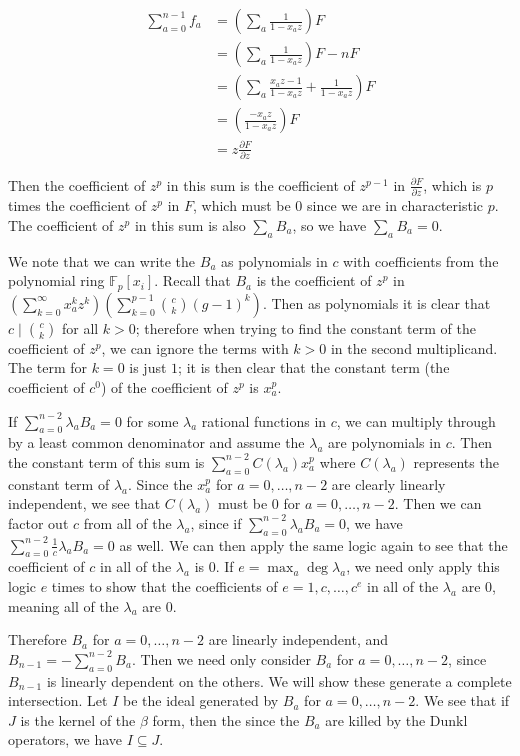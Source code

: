 \documentclass{article}
\numberwithin{equation}{section}
\begin{document}
\begin{align*}
\sum_{a=0}^{n-1} f_a&=\left(\sum_a \frac{1}{1-x_az}\right)F\\
&=\left(\sum_a \frac{1}{1-x_az}\right)F-nF\\
&=\left(\sum_a\frac{x_az-1}{1-x_az}+ \frac{1}{1-x_az}\right)F\\
&=\left(\frac{-x_az}{1-x_az}\right)F\\
&=z\frac{\partial F}{\partial z}
\end{align*}

Then the coefficient of $z^p$ in this sum is the coefficient of $z^{p-1}$ in $\frac{\partial F}{\partial z}$, which is $p$ times the coefficient of $z^p$ in $F$, which must be $0$ since we are in characteristic $p$. The coefficient of $z^p$ in this sum is also $\sum_a B_a$, so we have $\sum_a B_a=0$. 

We note that we can write the $B_a$ as polynomials in $c$ with coefficients from the polynomial ring $\mathbb{F}_p[x_i]$. Recall that $B_a$ is the coefficient of $z^p$ in $\left(\sum_{k=0}^\infty x_a^kz^k\right)\left(\sum_{k=0}^{p-1} \binom{c}{k} (g-1)^k\right)$. Then as polynomials it is clear that $c \mid \binom{c}{k}$ for all $k > 0$; therefore when trying to find the constant term of the coefficient of $z^p$, we can ignore the terms with $k > 0$ in the second multiplicand. The term for $k=0$ is just $1$; it is then clear that the constant term (the coefficient of $c^0$) of the coefficient of $z^p$ is $x_a^p$.

If $\sum_{a=0}^{n-2} \lambda_aB_a=0$ for some $\lambda_a$ rational functions in $c$, we can multiply through by a least common denominator and assume the $\lambda_a$ are polynomials in $c$. Then the constant term of this sum is $\sum_{a=0}^{n-2} C(\lambda_a)x_a^p$ where $C(\lambda_a)$ represents the constant term of $\lambda_a$. Since the $x_a^p$ for $a=0,\dots,n-2$ are clearly linearly independent, we see that $C(\lambda_a)$ must be $0$ for $a=0,\dots,n-2$. Then we can factor out $c$ from all of the $\lambda_a$, since if $\sum_{a=0}^{n-2} \lambda_aB_a=0$, we have $\sum_{a=0}^{n-2}\frac{1}{c}\lambda_aB_a=0$ as well. We can then apply the same logic again to see that the coefficient of $c$ in all of the $\lambda_a$ is $0$. If $e=\max_a\deg \lambda_a$, we need only apply this logic $e$ times to show that the coefficients of $e=1,c,\dots,c^e$ in all of the $\lambda_a$ are $0$, meaning all of the $\lambda_a$ are $0$. 

Therefore $B_a$ for $a=0,\dots,n-2$ are linearly independent, and $B_{n-1}=-\sum_{a=0}^{n-2} B_a$. 
Then we need only consider $B_a$ for $a=0,\dots,n-2$, since $B_{n-1}$ is linearly dependent on the others. We will show these generate a complete intersection. Let $I$ be the ideal generated by $B_a$ for $a=0,\dots,n-2$. We see that if $J$ is the kernel of the $\beta$ form, then the since the $B_a$ are killed by the Dunkl operators, we have $I \subseteq J$. 
\end{document}
